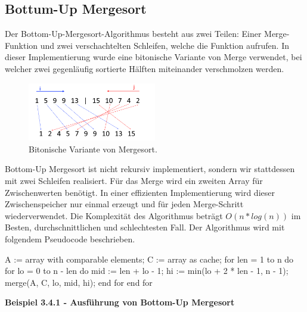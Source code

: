 \subsection{Bottum-Up Mergesort}

Der Bottom-Up-Mergesort-Algorithmus besteht aus zwei Teilen: Einer Merge-Funktion und zwei verschachtelten Schleifen, welche die Funktion aufrufen. In dieser Implementierung wurde eine bitonische Variante von Merge verwendet, bei welcher zwei gegenläufig sortierte Hälften miteinander verschmolzen werden.


\begin{figure}[htbp] 
	\centering
	\includegraphics[width=0.5\textwidth]{./img/bionic-merge}
	\caption{Bitonische Variante von Mergesort.}
\end{figure}

\noindent
Bottom-Up Mergesort ist nicht rekursiv implementiert, sondern wir stattdessen mit zwei Schleifen realisiert. Für das Merge wird ein zweiten Array für Zwischenwerten benötigt. In einer effizienten Implementierung wird dieser Zwischenspeicher nur einmal erzeugt und für jeden Merge-Schritt wiederverwendet. Die Komplexität des Algorithmus beträgt $O(n*log(n))$ im Besten, durchschnittlichen und schlechtesten Fall. Der Algorithmus wird mit folgendem Pseudocode beschrieben.

\begin{PseudoCode}
	A := array with comparable elements;
	C := array as cache;
	for len = 1 to n do
		for lo = 0 to n - len do
			mid := len + lo - 1;
			hi := min(lo + 2 * len - 1, n - 1);
			merge(A, C, lo, mid, hi);
		end for	
	end for
\end{PseudoCode}

\newpage
\noindent
\textbf{Beispiel 3.4.1 - Ausführung von Bottom-Up Mergesort}

